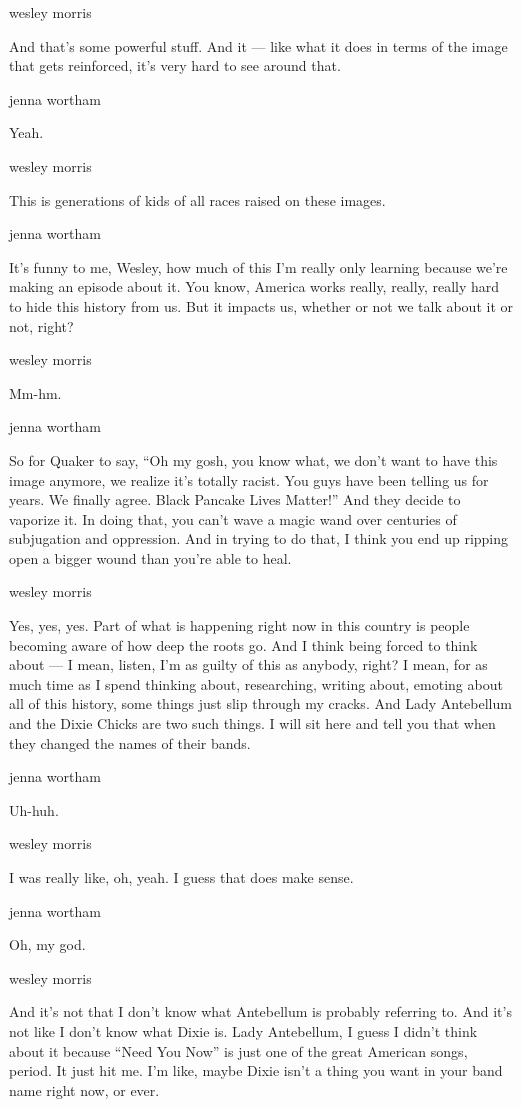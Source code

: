 wesley morris

And that's some powerful stuff. And it --- like what it does in terms of
the image that gets reinforced, it's very hard to see around that.

jenna wortham

Yeah.

wesley morris

This is generations of kids of all races raised on these images.

jenna wortham

It's funny to me, Wesley, how much of this I'm really only learning
because we're making an episode about it. You know, America works
really, really, really hard to hide this history from us. But it impacts
us, whether or not we talk about it or not, right?

wesley morris

Mm-hm.

jenna wortham

So for Quaker to say, ``Oh my gosh, you know what, we don't want to have
this image anymore, we realize it's totally racist. You guys have been
telling us for years. We finally agree. Black Pancake Lives Matter!''
And they decide to vaporize it. In doing that, you can't wave a magic
wand over centuries of subjugation and oppression. And in trying to do
that, I think you end up ripping open a bigger wound than you're able to
heal.

wesley morris

Yes, yes, yes. Part of what is happening right now in this country is
people becoming aware of how deep the roots go. And I think being forced
to think about --- I mean, listen, I'm as guilty of this as anybody,
right? I mean, for as much time as I spend thinking about, researching,
writing about, emoting about all of this history, some things just slip
through my cracks. And Lady Antebellum and the Dixie Chicks are two such
things. I will sit here and tell you that when they changed the names of
their bands.

jenna wortham

Uh-huh.

wesley morris

I was really like, oh, yeah. I guess that does make sense.

jenna wortham

Oh, my god.

wesley morris

And it's not that I don't know what Antebellum is probably referring to.
And it's not like I don't know what Dixie is. Lady Antebellum, I guess I
didn't think about it because ``Need You Now'' is just one of the great
American songs, period. It just hit me. I'm like, maybe Dixie isn't a
thing you want in your band name right now, or ever.

